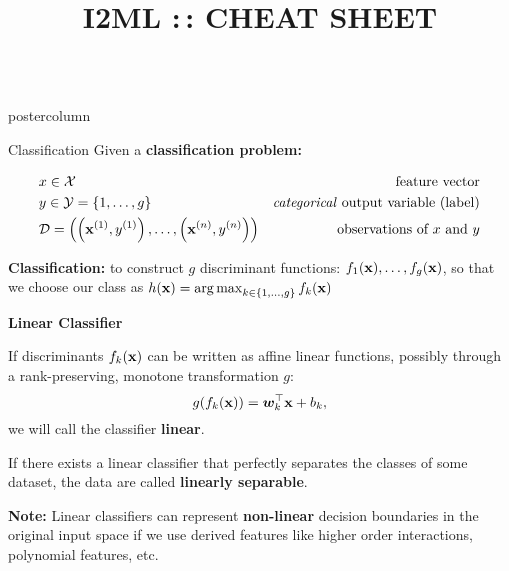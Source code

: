 \documentclass{beamer}
\title{I2ML :\,: CHEAT SHEET} %
\begin{document}
\begin{frame}[fragile]{}
\begin{columns}
	\begin{column}{.31\textwidth}
    \begin{beamercolorbox}[center]{postercolumn}
    
    \begin{minipage}{.98\textwidth}
  \parbox[t][\columnheight]{\textwidth}{
    \begin{myblock}{Classification}
						Given a \textbf{classification problem:}

						\begin{eqnarray*} 
              & x \in \Xspace \quad & \text{feature vector}\\ 
              & y \in \Yspace = \gset \quad & \text{\emph{categorical} output variable (label)}\\ 
              & \D = \Dset & \text{observations of $x$ and $y$} 
            \end{eqnarray*}
						
						\vspace*{1ex}
						
						\textbf{Classification:} to construct $g$ discriminant functions: $f_1(\xv), \ldots, f_g(\xv)$, 
            so that we choose our class as $h(\xv) = \argmax_{k \in \gset} \fkx[k]$
						
						\begin{codebox}
							\textbf{Linear Classifier}
						\end{codebox}
						If discriminants $\fkx$ can be written as affine linear functions, 
            possibly through a rank-preserving, monotone transformation $g$:
            $$g(\fkx) = \bm{w}_k^\top \xv + b_k,$$
            we will call the classifier \textbf{linear}.

            \vspace*{1ex}
            
            If there exists a linear classifier that perfectly separates the classes of some dataset, the data are called \textbf{linearly separable}.
						
            \vspace*{1ex}

            \textbf{Note: }Linear classifiers can represent \textbf{non-linear} decision boundaries in the original input space if we use derived features like higher order interactions, polynomial features, etc.

			    \vspace*{1ex}
			

\end{myblock}}
\end{minipage}
\end{beamercolorbox}
\end{column}
\end{columns}
\end{frame}
\end{document}

